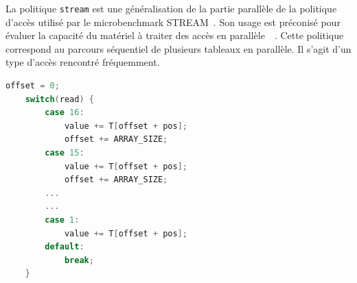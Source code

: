 La politique \texttt{stream} est une généralisation de la partie parallèle de la politique d'accès utilisé par le microbenchmark \textsc{STREAM}~\cite{McCalpin1995}.
Son usage est préconisé pour évaluer la capacité du matériel à traiter des accès en parallèle~\cite{black2013bandwidth}~\cite{valsan2016taming}.
Cette politique correspond au parcours séquentiel de plusieurs tableaux en parallèle.
Il s'agit d'un type d'accès rencontré fréquemment.

\begin{lstlisting}[language=c]
	offset = 0;
	switch(read) {
		case 16:
			value += T[offset + pos];
			offset += ARRAY_SIZE;
		case 15:
			value += T[offset + pos];
			offset += ARRAY_SIZE;
		...
		...
		case 1:
			value += T[offset + pos];
		default:
			break;
	} 

\end{lstlisting}



% 


